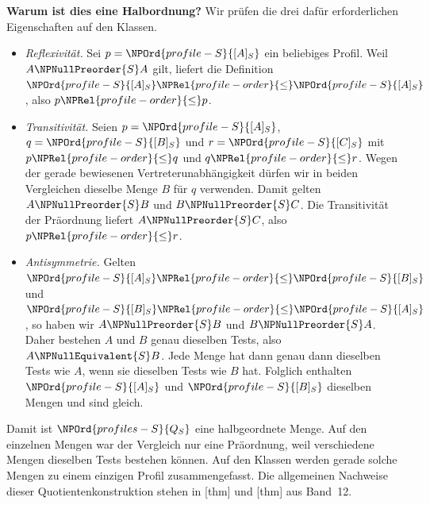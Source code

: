 \medskip\noindent\textbf{Warum ist dies eine Halbordnung?}
Wir prüfen die drei dafür erforderlichen Eigenschaften auf den Klassen.
\begin{itemize}
 \item \emph{Reflexivität.} Sei \(p=\NPOrd{profile-S}{[A]_S}\) ein beliebiges Profil.
       Weil \(A\NPNullPreorder{S} A\) gilt, liefert die Definition
       \(\NPOrd{profile-S}{[A]_S}\NPRel{profile-order}{\le}\NPOrd{profile-S}{[A]_S}\), also \(p\NPRel{profile-order}{\le} p\).
 \item \emph{Transitivität.} Seien \(p=\NPOrd{profile-S}{[A]_S}\), \(q=\NPOrd{profile-S}{[B]_S}\) und
       \(r=\NPOrd{profile-S}{[C]_S}\) mit \(p\NPRel{profile-order}{\le} q\) und \(q\NPRel{profile-order}{\le} r\).
       Wegen der gerade bewiesenen Vertreterunabhängigkeit dürfen wir
       in beiden Vergleichen dieselbe Menge \(B\) für \(q\) verwenden.
       Damit gelten \(A\NPNullPreorder{S} B\) und \(B\NPNullPreorder{S} C\).
       Die Transitivität der Präordnung liefert \(A\NPNullPreorder{S} C\),
       also \(p\NPRel{profile-order}{\le} r\).
 \item \emph{Antisymmetrie.} Gelten \(\NPOrd{profile-S}{[A]_S}\NPRel{profile-order}{\le}\NPOrd{profile-S}{[B]_S}\) und
       \(\NPOrd{profile-S}{[B]_S}\NPRel{profile-order}{\le}\NPOrd{profile-S}{[A]_S}\), so haben wir \(A\NPNullPreorder{S} B\) und
       \(B\NPNullPreorder{S} A\). Daher bestehen \(A\) und \(B\) genau
       dieselben Tests, also \(A\NPNullEquivalent{S} B\).
       Jede Menge hat dann genau dann dieselben Tests wie \(A\),
       wenn sie dieselben Tests wie \(B\) hat. Folglich enthalten
       \(\NPOrd{profile-S}{[A]_S}\) und \(\NPOrd{profile-S}{[B]_S}\) dieselben Mengen und sind gleich.
\end{itemize}
Damit ist \(\NPOrd{profiles-S}{Q_S}\) eine halbgeordnete Menge. Auf den einzelnen Mengen
war der Vergleich nur eine Präordnung, weil verschiedene Mengen
dieselben Tests bestehen können. Auf den Klassen werden gerade
solche Mengen zu einem einzigen Profil zusammengefasst.
Die allgemeinen Nachweise dieser Quotientenkonstruktion stehen in
[thm] und
[thm] aus Band~12.

